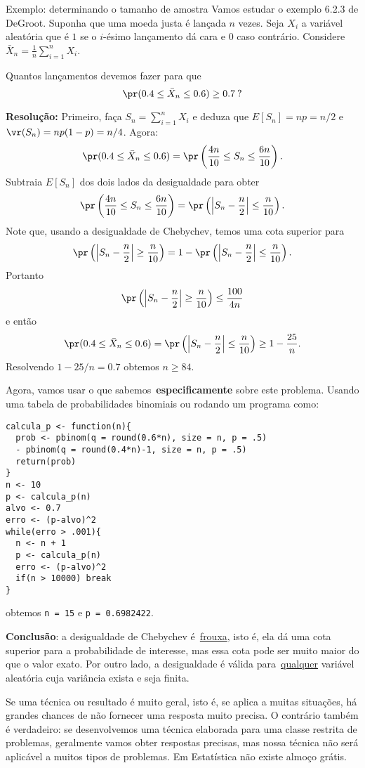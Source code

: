 \begin{frame}{Exemplo: determinando o tamanho de amostra}
Vamos estudar o exemplo 6.2.3 de DeGroot.
Suponha  que uma moeda justa é lançada $n$ vezes.
Seja $X_i$ a variável aleatória que é $1$ se o $i$-ésimo lançamento dá cara e $0$ caso contrário.
Considere $\bar{X}_n = \frac{1}{n} \sum_{i=1}^n X_i$.
\begin{pergunta}
Quantos lançamentos devemos fazer para que 
$$ \pr(0.4 \leq \bar{X}_n \leq 0.6) \geq 0.7\: ?$$
\end{pergunta}
\framebreak
\textbf{Resolução:} Primeiro, faça $S_n = \sum_{i=1}^n X_i$ e deduza que $E[S_n] = np = n/2$ e $\vr(S_n) = n p(1-p) = n/4$.
Agora:
$$ \pr(0.4 \leq \bar{X}_n \leq 0.6) = \pr\left(\frac{4n}{10} \leq S_n  \leq \frac{6n}{10} \right).$$
Subtraia $E[S_n]$ dos dois lados da desigualdade para obter
$$ \pr\left(\frac{4n}{10} \leq S_n  \leq \frac{6n}{10} \right) = \pr \left(\left|S_n - \frac{n}{2} \right|\leq \frac{n}{10} \right) .$$
Note que, usando a desigualdade de Chebychev, temos uma cota superior para 
$$\pr \left(\left|S_n - \frac{n}{2} \right|\geq \frac{n}{10} \right) = 1 - \pr \left(\left|S_n - \frac{n}{2} \right|\leq \frac{n}{10} \right).$$
Portanto
$$\pr \left(\left|S_n - \frac{n}{2} \right|\geq \frac{n}{10} \right) \leq \frac{100}{4n}$$ 
e então
$$ \pr(0.4 \leq \bar{X}_n \leq 0.6) = \pr \left(\left|S_n - \frac{n}{2} \right|\leq \frac{n}{10} \right) \geq 1 - \frac{25}{n}.$$
Resolvendo $ 1 - 25/n = 0.7$ obtemos $n \geq 84$.

\framebreak
Agora, vamos usar o que sabemos~\textbf{especificamente} sobre este problema.
Usando uma tabela de probabilidades binomiais ou rodando um programa como:
\begin{verbatim}
calcula_p <- function(n){
  prob <- pbinom(q = round(0.6*n), size = n, p = .5) 
  - pbinom(q = round(0.4*n)-1, size = n, p = .5)
  return(prob)
}
n <- 10
p <- calcula_p(n)
alvo <- 0.7
erro <- (p-alvo)^2
while(erro > .001){
  n <- n + 1
  p <- calcula_p(n)
  erro <- (p-alvo)^2
  if(n > 10000) break
}
\end{verbatim}
obtemos \verb|n = 15| e \verb|p = 0.6982422|.

\textbf{Conclusão}: a desigualdade de Chebychev é~\underline{frouxa}, isto é, ela dá uma cota superior para a probabilidade de interesse, mas essa cota pode ser muito maior do que o valor exato.
Por outro lado, a desigualdade é válida para~\underline{qualquer} variável aleatória cuja variância exista e seja finita.

\begin{ideia}
\label{idea:no_free_lunch}
 Se uma técnica ou resultado é muito geral, isto é, se aplica a muitas situações, há grandes chances de não fornecer uma resposta muito precisa.
 O contrário também é verdadeiro: se desenvolvemos uma técnica elaborada para uma classe restrita de problemas, geralmente vamos obter respostas precisas, mas nossa técnica não será aplicável a muitos tipos de problemas.
 Em Estatística não existe almoço grátis.
\end{ideia}

\end{frame}
